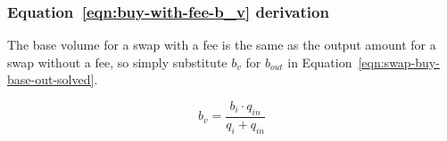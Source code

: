\subsubsection{Equation~\ref{eqn:buy-with-fee-b_v} derivation}%
\label{sssec:equation-eqn-buy-with-fee-b-v-derivation}

The base volume for a swap with a fee is the same as the output amount for a swap
without a fee, so simply substitute $b_v$ for $b_{out}$ in
Equation~\ref{eqn:swap-buy-base-out-solved}.

\begin{equation}
	b_v = \frac{b_i \cdot q_{in}}{q_i + q_{in}} \nonumber
\end{equation}

